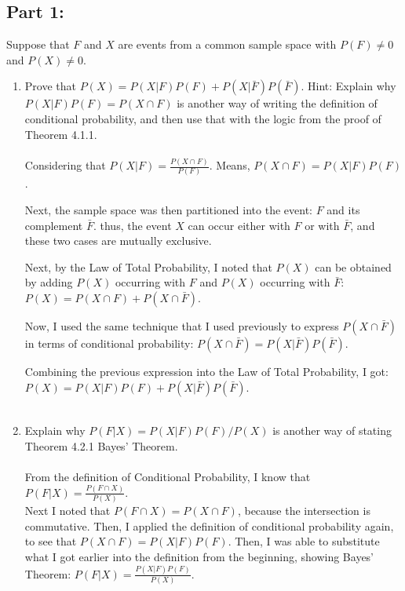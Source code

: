 \documentclass{amsart}
\theoremstyle{definition}
\theoremstyle{Exercise}
\theoremstyle{remark}
\theoremstyle{rule}
\numberwithin{equation}{section}
\begin{document}
	\subsection*{Part 1:}
	Suppose that $F$ and $X$ are events from a common sample space with
	$P(F) \neq 0$ and $P(X) \neq 0$. \\
	\begin{enumerate}[label=(\alph{*})]
		\item Prove that $P(X) = P(X|F)P(F) + P(X|\bar{F})P(\bar{F})$. Hint: Explain
			why $P(X|F)P(F) = P(X \cap F)$ is another way of writing the definition of
			conditional probability, and then use that with the logic from the proof
			of Theorem 4.1.1. \\\\
			Considering that $P(X|F) = \frac{P(X \cap F)}{P(F)}$. Means, $P(X \cap F) =
			P(X|F)P(F)$.

			Next, the sample space was then partitioned into the event: $F$ and its complement
			$\bar{F}$. thus, the event $X$ can occur either with $F$ or with $\bar{F}$,
			and these two cases are mutually exclusive.

			Next, by the Law of Total Probability, I noted that $P(X)$ can be obtained
			by adding $P(X)$ occurring with $F$ and $P(X)$ occurring with $\bar{F}$: $P
			(X) = P(X \cap F) + P(X \cap \bar{F})$.

			Now, I used the same technique that I used previously to express
			$P(X \cap \bar{F})$ in terms of conditional probability: $P(X \cap \bar{F})
			= P(X|\bar{F})P(\bar{F})$.

			Combining the previous expression into the Law of Total Probability, I got:
			$P(X) = P(X|F)P(F) + P(X|\bar{F})P(\bar{F})$. \\\\

		\item Explain why $P(F|X) = P(X|F)P(F)/P(X)$ is another way of stating Theorem
			4.2.1 Bayes’ Theorem. \\\\
			From the definition of Conditional Probability, I know that $P(F|X) = \frac{P(F
			\cap X)}{P(X)}$.\\ Next I noted that $P(F \cap X) = P(X \cap F)$, because
			the intersection is commutative. Then, I applied the definition of
			conditional probability again, to see that $P(X \cap F) = P(X|F)P(F)$.
			Then, I was able to substitute what I got earlier into the definition from
			the beginning, showing Bayes' Theorem: $P(F|X) = \frac{P(X|F)P(F)}{P(X)}$.
			\\\\
	\end{enumerate}
\end{document}
